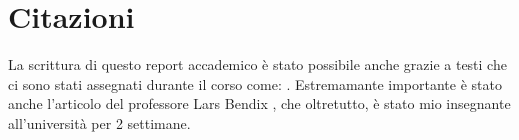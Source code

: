 \section{Citazioni}
La scrittura di questo report accademico è stato possibile anche grazie a testi che ci sono stati assegnati durante il corso
come:  \cite{lewis2009component,robles2004software}.
Estremamante importante è stato anche l'articolo del professore Lars Bendix \cite{bendixshort}, che oltretutto, è stato mio insegnante all'università per 2 settimane.